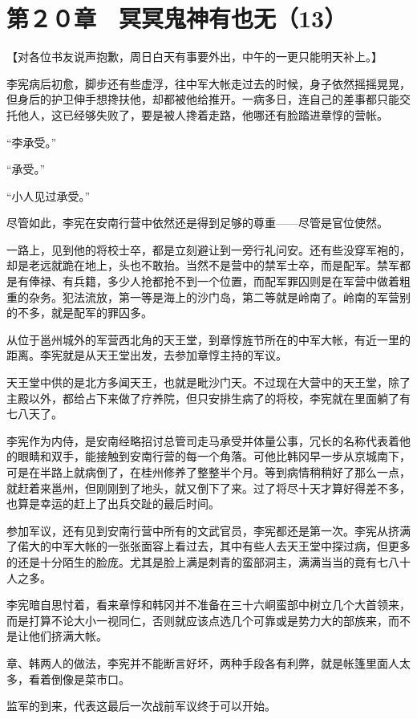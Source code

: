 \section{第２０章　冥冥鬼神有也无（13）}

【对各位书友说声抱歉，周日白天有事要外出，中午的一更只能明天补上。】

李宪病后初愈，脚步还有些虚浮，往中军大帐走过去的时候，身子依然摇摇晃晃，但身后的护卫伸手想搀扶他，却都被他给推开。一病多日，连自己的差事都只能交托他人，这已经够失败了，要是被人搀着走路，他哪还有脸踏进章惇的营帐。

“李承受。”

“承受。”

“小人见过承受。”

尽管如此，李宪在安南行营中依然还是得到足够的尊重——尽管是官位使然。

一路上，见到他的将校士卒，都是立刻避让到一旁行礼问安。还有些没穿军袍的，却是老远就跪在地上，头也不敢抬。当然不是营中的禁军士卒，而是配军。禁军都是有俸禄、有兵籍，多少人抢都抢不到一个位置，而配军罪囚则是在军营中做着粗重的杂务。犯法流放，第一等是海上的沙门岛，第二等就是岭南了。岭南的军营别的不多，就是配军的罪囚多。

从位于邕州城外的军营西北角的天王堂，到章惇旌节所在的中军大帐，有近一里的距离。李宪就是从天王堂出发，去参加章惇主持的军议。

天王堂中供的是北方多闻天王，也就是毗沙门天。不过现在大营中的天王堂，除了主殿以外，都给占下来做了疗养院，但只安排生病了的将校，李宪就在里面躺了有七八天了。

李宪作为内侍，是安南经略招讨总管司走马承受并体量公事，冗长的名称代表着他的眼睛和双手，能接触到安南行营的每一个角落。可他比韩冈早一步从京城南下，可是在半路上就病倒了，在桂州修养了整整半个月。等到病情稍稍好了那么一点，就赶着来邕州，但刚刚到了地头，就又倒下了来。过了将尽十天才算好得差不多，也算是幸运的赶上了出兵交趾的最后时间。

参加军议，还有见到安南行营中所有的文武官员，李宪都还是第一次。李宪从挤满了偌大的中军大帐的一张张面容上看过去，其中有些人去天王堂中探过病，但更多的还是十分陌生的脸庞。尤其是脸上满是刺青的蛮部洞主，满满当当的竟有七八十人之多。

李宪暗自思忖着，看来章惇和韩冈并不准备在三十六峒蛮部中树立几个大首领来，而是打算不论大小一视同仁，否则就应该点选几个可靠或是势力大的部族来，而不是让他们挤满大帐。

章、韩两人的做法，李宪并不能断言好坏，两种手段各有利弊，就是帐篷里面人太多，看着倒像是菜市口。

监军的到来，代表这最后一次战前军议终于可以开始。

